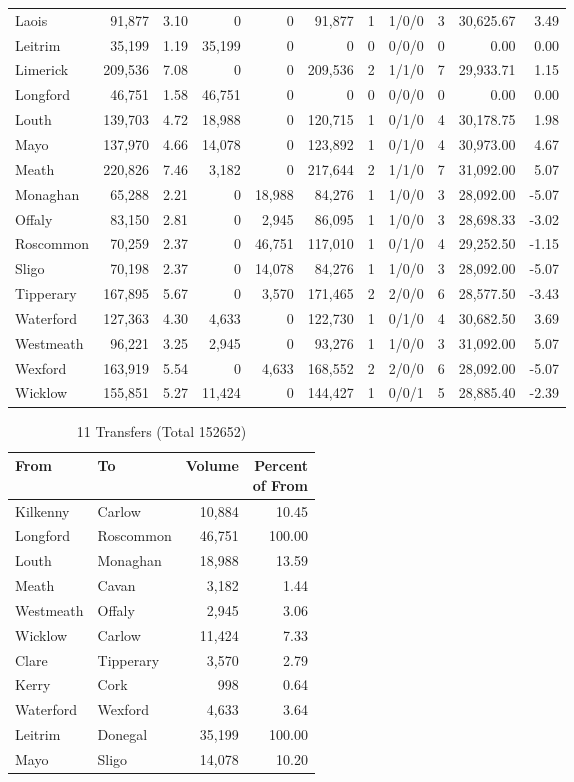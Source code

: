 \documentclass[a4paper]{article}
\begin{document}
\begin{longtable}{lrrrrrrlrrr}
Laois&91,877& 3.10&0&0&91,877&1&1/0/0&3&30,625.67& 3.49\\ 
Leitrim&35,199& 1.19&35,199&0&0&0&0/0/0&0& 0.00& 0.00\\ 
Limerick&209,536& 7.08&0&0&209,536&2&1/1/0&7&29,933.71& 1.15\\ 
Longford&46,751& 1.58&46,751&0&0&0&0/0/0&0& 0.00& 0.00\\ 
Louth&139,703& 4.72&18,988&0&120,715&1&0/1/0&4&30,178.75& 1.98\\ 
Mayo&137,970& 4.66&14,078&0&123,892&1&0/1/0&4&30,973.00& 4.67\\ 
Meath&220,826& 7.46&3,182&0&217,644&2&1/1/0&7&31,092.00& 5.07\\ 
Monaghan&65,288& 2.21&0&18,988&84,276&1&1/0/0&3&28,092.00&-5.07\\ 
Offaly&83,150& 2.81&0&2,945&86,095&1&1/0/0&3&28,698.33&-3.02\\ 
Roscommon&70,259& 2.37&0&46,751&117,010&1&0/1/0&4&29,252.50&-1.15\\ 
Sligo&70,198& 2.37&0&14,078&84,276&1&1/0/0&3&28,092.00&-5.07\\ 
Tipperary&167,895& 5.67&0&3,570&171,465&2&2/0/0&6&28,577.50&-3.43\\ 
Waterford&127,363& 4.30&4,633&0&122,730&1&0/1/0&4&30,682.50& 3.69\\ 
Westmeath&96,221& 3.25&2,945&0&93,276&1&1/0/0&3&31,092.00& 5.07\\ 
Wexford&163,919& 5.54&0&4,633&168,552&2&2/0/0&6&28,092.00&-5.07\\ 
Wicklow&155,851& 5.27&11,424&0&144,427&1&0/0/1&5&28,885.40&-2.39\\ 
\end{longtable}

\begin{table}[htbp]
\caption{11 Transfers (Total 152652)}
\centering
\begin{tabular}{llrr} \toprule
From &To &Volume &\shortstack{Percent\\of From} \\ \midrule
Kilkenny&Carlow&10,884&10.45\\ 
Longford&Roscommon&46,751&100.00\\ 
Louth&Monaghan&18,988&13.59\\ 
Meath&Cavan&3,182& 1.44\\ 
Westmeath&Offaly&2,945& 3.06\\ 
Wicklow&Carlow&11,424& 7.33\\ 
Clare&Tipperary&3,570& 2.79\\ 
Kerry&Cork&998& 0.64\\ 
Waterford&Wexford&4,633& 3.64\\ 
Leitrim&Donegal&35,199&100.00\\ 
Mayo&Sligo&14,078&10.20\\ 
\bottomrule
\end{tabular}
\end{table}
\end{document}
